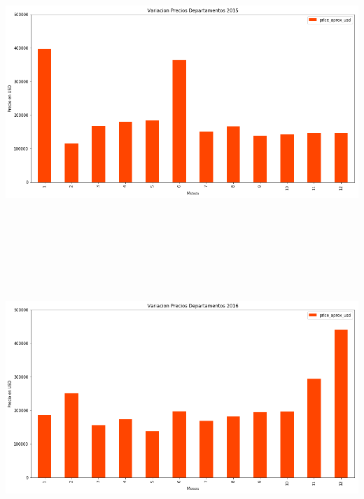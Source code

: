 \documentclass[a4paper, 10pt]{article}
\begin{document}
        \begin{center}
              \includegraphics[width=6in, height=4.2in]{images/vDeptos2015}
        \end{center}
        \begin{center}
              \includegraphics[width=6in, height=4.2in]{images/vDeptos2016}
        \end{center}
\end{document}

